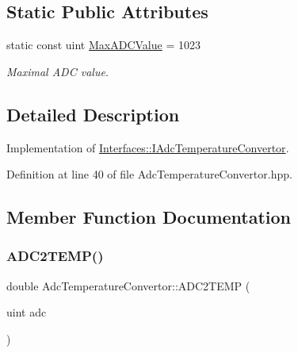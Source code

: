 \subsection*{Static Public Attributes}
\begin{DoxyCompactItemize}
\item 
\mbox{\label{class_adc_temperature_convertor_a1c38417365e2f3a2ecc144e34e1b359b}} 
static const uint \hyperlink{class_adc_temperature_convertor_a1c38417365e2f3a2ecc144e34e1b359b}{Max\+A\+D\+C\+Value} = 1023
\begin{DoxyCompactList}\small\item\em Maximal A\+DC value. \end{DoxyCompactList}\end{DoxyCompactItemize}


\subsection{Detailed Description}
Implementation of \hyperlink{class_interfaces_1_1_i_adc_temperature_convertor}{Interfaces\+::\+I\+Adc\+Temperature\+Convertor}. 

Definition at line 40 of file Adc\+Temperature\+Convertor.\+hpp.



\subsection{Member Function Documentation}
\mbox{\label{class_adc_temperature_convertor_a3ee4549435400d9ed319fd5fdb83c97f}} 
\subsubsection{\texorpdfstring{A\+D\+C2\+T\+E\+M\+P()}{ADC2TEMP()}}
{\footnotesize\ttfamily double Adc\+Temperature\+Convertor\+::\+A\+D\+C2\+T\+E\+MP (\begin{DoxyParamCaption}\item[{uint}]{adc }\end{DoxyParamCaption})\hspace{0.3cm}{\ttfamily [virtual]}}



